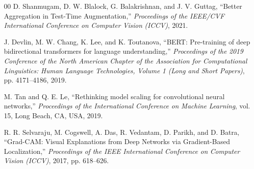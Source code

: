 \documentclass[conference]{IEEEtran}
\begin{document}
\begin{thebibliography}{00}
D. Shanmugam, D. W. Blalock, G. Balakrishnan, and J. V. Guttag,
``Better Aggregation in Test-Time Augmentation,''
\textit{Proceedings of the IEEE/CVF International Conference on Computer Vision (ICCV)}, 2021.

J. Devlin, M. W. Chang, K. Lee, and K. Toutanova, 
``BERT: Pre-training of deep bidirectional transformers for language understanding,'' 
\textit{Proceedings of the 2019 Conference of the North American Chapter of the Association for Computational Linguistics: Human Language Technologies, Volume 1 (Long and Short Papers)}, pp. 4171--4186, 2019.

M. Tan and Q. E. Le, 
``Rethinking model scaling for convolutional neural networks,'' 
\textit{Proceedings of the International Conference on Machine Learning}, vol. 15, Long Beach, CA, USA, 2019.

R. R. Selvaraju, M. Cogswell, A. Das, R. Vedantam, D. Parikh, and D. Batra,
``Grad-CAM: Visual Explanations from Deep Networks via Gradient-Based Localization,''
\textit{Proceedings of the IEEE International Conference on Computer Vision (ICCV)},
2017, pp. 618--626.

\end{thebibliography}
\end{document}
